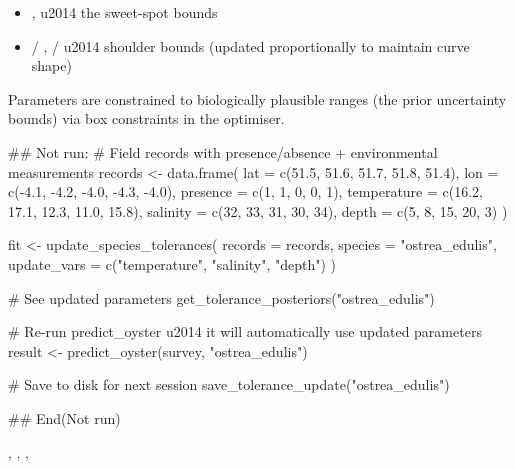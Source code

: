 \documentclass[a4paper]{book}
\begin{document}
\begin{Arguments}
\begin{itemize}
\item{} ,  \bsl{}u2014 the sweet-spot bounds
\item{}  / ,  /  \bsl{}u2014 shoulder
bounds (updated proportionally to maintain curve shape)

\end{itemize}


Parameters are constrained to biologically plausible ranges (the prior
uncertainty bounds) via box constraints in the optimiser.



## Not run: 
\# Field records with presence/absence + environmental measurements
records <- data.frame(
  lat      = c(51.5, 51.6, 51.7, 51.8, 51.4),
  lon      = c(-4.1, -4.2, -4.0, -4.3, -4.0),
  presence = c(1, 1, 0, 0, 1),
  temperature = c(16.2, 17.1, 12.3, 11.0, 15.8),
  salinity    = c(32, 33, 31, 30, 34),
  depth       = c(5, 8, 15, 20, 3)
)

fit <- update\_species\_tolerances(
  records = records,
  species = "ostrea\_edulis",
  update\_vars = c("temperature", "salinity", "depth")
)

\# See updated parameters
get\_tolerance\_posteriors("ostrea\_edulis")

\# Re-run predict\_oyster \bsl{}u2014 it will automatically use updated parameters
result <- predict\_oyster(survey, "ostrea\_edulis")

\# Save to disk for next session
save\_tolerance\_update("ostrea\_edulis")

## End(Not run)


, ,
, 

\end{Arguments}
%
\end{document}
